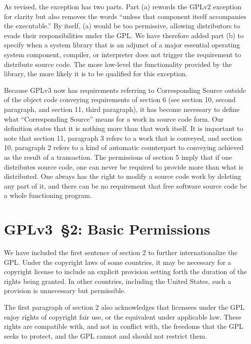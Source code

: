 As revised, the exception has two parts. Part (a) rewords the GPLv2
exception for clarity but also removes the words ``unless that
component itself accompanies the executable.''  By itself, (a) would
be too permissive, allowing distributors to evade their
responsibilities under the GPL.  We have therefore added part (b) to
specify when a system library that is an adjunct of a major essential
operating system component, compiler, or interpreter does not trigger
the requirement to distribute source code.  The more low-level the
functionality provided by the library, the more likely it is to be
qualified for this exception.

Because GPLv3 now has requirements referring to Corresponding Source outside
of the object code conveying requirements of section 6 (see section 10,
second paragraph, and section 11, third paragraph), it has become necessary
to define what ``Corresponding Source'' means for a work in source code form.
Our definition states that it is nothing more than that work itself. It is
important to note that section 11, paragraph 3 refers to a work that is
conveyed, and section 10, paragraph 2 refers to a kind of automatic
counterpart to conveying achieved as the result of a transaction.  The
permissions of section 5 imply that if one distributes source code, one can
never be required to provide more than what is distributed.  One always has
the right to modify a source code work by deleting any part of it, and there
can be no requirement that free software source code be a whole functioning
program.

\section{GPLv3~\S2: Basic Permissions}


We have included the first sentence of section 2 to further internationalize
the GPL. Under the copyright laws of some countries, it may be necessary for
a copyright license to include an explicit provision setting forth the
duration of the rights being granted. In other countries, including the
United States, such a provision is unnecessary but permissible.

The first paragraph of section 2 also acknowledges that licensees under the
GPL enjoy rights of copyright fair use, or the equivalent under applicable
law. These rights are compatible with, and not in conflict with, the freedoms
that the GPL seeks to protect, and the GPL cannot and should not restrict
them.

